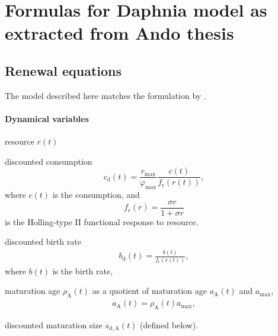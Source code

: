 \documentclass[11pt]{scrartcl}
\renewcommand{\phi}{\varphi}
\newcommand{\bd}{b_\mathrm{d}}
\newcommand{\cd}{c_\mathrm{d}}
\newcommand{\fr}{f_\mathrm{r}}
\newcommand{\rmax}{r_\mathrm{max}}
\newcommand{\amax}{{a_\mathrm{max}}}
\newcommand{\fmax}{\phi_\mathrm{max}}
\newcommand{\sda}{s_\mathrm{d,A}}
\newcommand{\aA}{a_\mathrm{A}}
\newcommand{\ra}{\rho_\mathrm{A}}
\begin{document}
\section*{Formulas for Daphnia model as extracted from Ando thesis}
\tableofcontents
\bigskip
\subsection{Renewal equations}\label{sec:renewal}
The model described here matches the formulation by \citet{ando2020collocation}.
\paragraph{Dynamical variables}
\begin{compactitem}
\item resource $r(t)$
\item discounted consumption $$\cd(t)=\frac{\rmax}{\fmax}\frac{c(t)}{\fr(r(t))},$$
  where $c(t)$ is the consumption, and 
  $$\fr(r)=\frac{\sigma r}{1+\sigma r}$$ is the Holling-type II
  functional response to resource.
\item   discounted birth rate
  \begin{align*}
    \bd(t)=\frac{b(t)}{\fr(r(t))},
  \end{align*}
  where $b(t)$ is the birth rate,
\item maturation age $\ra(t)$ as a quotient of maturation age $\aA(t)$ and $\amax$,
  \begin{align*}
    \aA(t)=\ra(t)\amax,
  \end{align*}
\item discounted maturation size $\sda(t)$ (defined below).
\end{compactitem}
\end{document}
